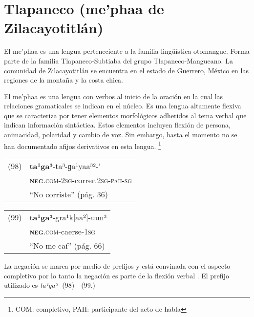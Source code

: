 \section*{Tlapaneco (me’phaa de Zilacayotitlán)}

\noindent El me’phaa es una lengua perteneciente a la familia lingüística otomangue. Forma parte de la familia Tlapaneco-Subtiaba del grupo Tlapaneco-Mangueano. La comunidad de Zilacayotitlán se encuentra en el estado de Guerrero, México en las regiones de la montaña y la costa chica. 

El me'phaa es una lengua con verbos al inicio de la oración en la cual las relaciones gramaticales se indican en el núcleo. Es una lengua altamente flexiva que se caracteriza por tener elementos morfológicos adheridos al tema verbal que indican información sintáctica. Estos elementos incluyen flexión de persona, animacidad, polaridad y cambio de voz. Sin embargo, hasta el momento no se han documentado afijos derivativos en esta lengua.
\footnote{COM: completivo, PAH: participante del acto de habla}
\vspace{0.5cm}

{\setmainfont{Charis SIL} 

\begin{tabular}{ll}
(98) & \textbf{ta¹ga³}-ta³-ɡa¹yaa³²-’\\
& \textsc{\textbf{neg}.com-2sg}-correr.\textsc{2sg-pah-sg}\\
& ``No corriste'' (pág. 36)
\end{tabular} \vspace{0.5cm}

\begin{tabular}{ll}
(99) & \textbf{ta¹ga³}-gra¹k[aa²]-uun³ \\
& \textsc{\textbf{neg}.com}-caerse-\textsc{1sg} \\
& ``No me caí'' (pág. 66)
\end{tabular} \vspace{0.5cm}

}

La negación se marca por medio de prefijos y está convinada con el aspecto completivo por lo tanto la negación es parte de la flexión verbal \textcolor{MidnightBlue}{\citep{Tlapaneco}}. El prefijo utilizado es {\setmainfont{Charis SIL} \textit{ta¹ga³-}} (98) - (99.)